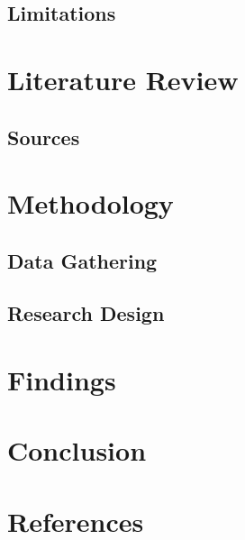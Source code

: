 \documentclass[letterpaper]{article}
\begin{document}
\subsection{Limitations}
\section{Literature Review}
\subsection{Sources}
\section{Methodology}
\subsection{Data Gathering}
\subsection{Research Design}
\section{Findings}
\section{Conclusion}
\section{References}
\end{document}
